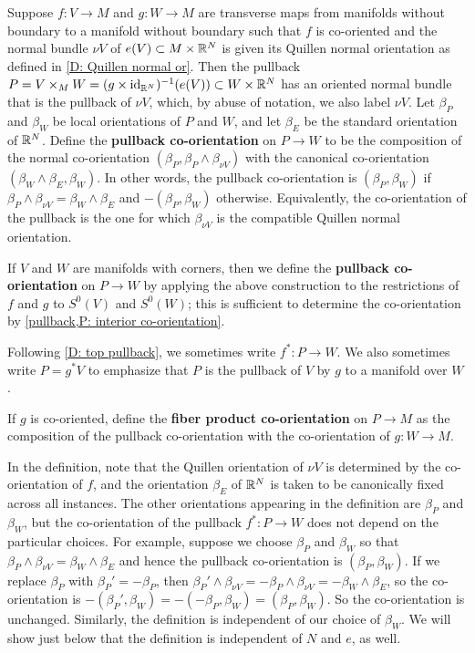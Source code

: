 \begin{definition}\label{D: pullback coorient}
	Suppose $f \colon V \to M$ and $g \colon W \to M$ are transverse maps from manifolds without boundary to a manifold without boundary such that $f$ is co-oriented and the normal bundle $\nu V$ of $e(V) \subset M \times \mathbb{R}^N$ is given its Quillen normal orientation as defined in \cref{D: Quillen normal or}.
	Then the pullback $P = V \times_M W = (g \times \mathrm{id}_{\mathbb{R}^N})^{-1}(e(V)) \subset W \times \mathbb{R}^N$ has an oriented normal bundle that is the pullback of $\nu V$, which, by abuse of notation, we also label $\nu V$.
	Let $\beta_P$ and $\beta_W$ be local orientations of $P$ and $W$, and let $\beta_E$ be the standard orientation of $\mathbb{R}^N$.
	Define the \textbf{pullback co-orientation} on $P \to W$ to be the composition of the normal co-orientation $(\beta_P,\beta_P \wedge \beta_{\nu V})$ with the canonical co-orientation $(\beta_W \wedge \beta_E,\beta_W)$.
	In other words, the pullback co-orientation is $(\beta_P,\beta_W)$ if $\beta_P \wedge \beta_{\nu V} = \beta_W \wedge \beta_E$ and $-(\beta_P,\beta_W)$ otherwise.
 Equivalently, the co-orientation of the pullback is the one for which $\beta_{\nu V}$ is the compatible Quillen normal orientation.

	If $V$ and $W$ are manifolds with corners, then we define the \textbf{pullback co-orientation} on $P \to W$ by applying the above construction to the restrictions of $f$ and $g$ to $S^0(V)$ and $S^0(W)$; this is sufficient to determine the co-orientation by \cref{pullback,P: interior co-orientation}.

	Following \cref{D: top pullback}, we sometimes write $f^* \colon P \to W$.
	We also sometimes write $P = g^*V$ to emphasize that $P$ is the pullback of $V$ by $g$ to a manifold over $W$.

	If $g$ is co-oriented, define the \textbf{fiber product co-orientation} on $P \to M$ as the composition of the pullback co-orientation with the co-orientation of $g \colon W \to M$.
\end{definition}

In the definition, note that the Quillen orientation of $\nu V$ is determined by the co-orientation of $f$, and the orientation $\beta_E$ of $\mathbb{R}^N$ is taken to be canonically fixed across all instances.
The other orientations appearing in the definition are $\beta_P$ and $\beta_W$, but the co-orientation of the pullback $f^* \colon P \to W$ does not depend on the particular choices.
For example, suppose we choose $\beta_P$ and $\beta_W$ so that $\beta_P \wedge \beta_{\nu V} = \beta_W \wedge \beta_E$ and hence the pullback co-orientation is $(\beta_P,\beta_W)$.
If we replace $\beta_P$ with $\beta_P' = -\beta_P$, then
$\beta_P' \wedge \beta_{\nu V} = -\beta_P \wedge \beta_{\nu V} = -\beta_W \wedge \beta_E$, so the co-orientation is $-(\beta_P',\beta_W) = -(-\beta_P,\beta_W) = (\beta_P,\beta_W)$.
So the co-orientation is unchanged.
Similarly, the definition is independent of our choice of $\beta_W$.
We will show just below that the definition is independent of $N$ and $e$, as well.

